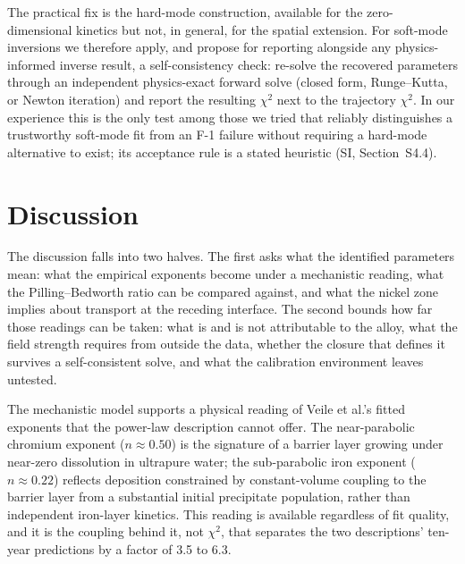 \documentclass[pdflatex,sn-nature]{sn-jnl}
\begin{document}
The practical fix is the hard-mode construction, available for the
zero-dimensional kinetics but not, in general, for the spatial
extension. For soft-mode inversions we therefore apply, and propose for
reporting alongside any physics-informed inverse result, a
self-consistency check: re-solve the recovered parameters through an
independent physics-exact forward solve (closed form, Runge--Kutta, or
Newton iteration) and report the resulting $\chi^2$ next to the
trajectory $\chi^2$. In our experience this is the only test among
those we tried that reliably distinguishes a trustworthy soft-mode fit
from an F-1 failure without requiring a hard-mode alternative to exist;
its acceptance rule is a stated heuristic (SI, Section~S4.4).

\section{Discussion}\label{sec:discussion}

The discussion falls into two halves. The first asks what the identified
parameters mean: what the empirical exponents become under a
mechanistic reading, what the Pilling--Bedworth ratio can be compared
against, and what the nickel zone implies about transport at the
receding interface. The second bounds how far those readings can be
taken: what is and is not attributable to the alloy, what the field
strength requires from outside the data, whether the closure that
defines it survives a self-consistent solve, and what the calibration
environment leaves untested.

The mechanistic model supports a physical reading of Veile et al.'s
fitted exponents that the power-law description cannot offer. The
near-parabolic chromium exponent ($n \approx 0.50$) is the signature of
a barrier layer growing under near-zero dissolution in ultrapure water;
the sub-parabolic iron exponent ($n \approx 0.22$) reflects deposition
constrained by constant-volume coupling to the barrier layer from a
substantial initial precipitate population, rather than independent
iron-layer kinetics. This reading is available regardless of fit
quality, and it is the coupling behind it, not $\chi^2$, that separates
the two descriptions' ten-year predictions by a factor of 3.5 to 6.3.
\end{document}
